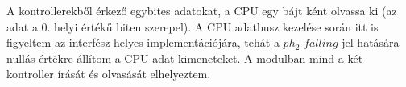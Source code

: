 A kontrollerekből érkező egybites adatokat, a CPU egy bájt ként olvassa ki (az adat a 0. helyi értékű biten szerepel). A CPU adatbusz kezelése során itt is figyeltem az interfész helyes implementációjára, tehát a $ph_2\_falling$ jel hatására nullás értékre állítom a CPU adat kimeneteket. A modulban mind a két kontroller írását és olvasását elhelyeztem.

